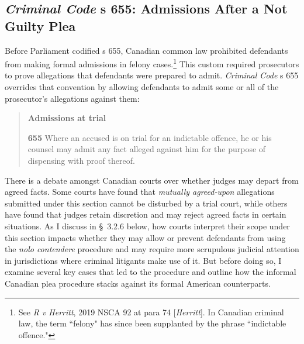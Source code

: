 \subsection{\textit{Criminal Code} s 655: Admissions After a Not Guilty Plea}

Before Parliament codified s 655, Canadian common law prohibited defendants from making formal admissions in felony cases.\footnote{See \textit{R v Herritt}, 2019 NSCA 92 at para 74 [\textit{Herritt}]. In Canadian criminal law, the term ``felony" has since been supplanted by the phrase ``indictable offence."} This custom required prosecutors to prove allegations that defendants were prepared to admit. \textit{Criminal Code} s 655 overrides that convention by allowing defendants to admit some or all of the prosecutor's allegations against them:

\begin{quote}
    \singlespacing
    \textbf{Admissions at trial}
    
    \textbf{655} Where an accused is on trial for an indictable offence, he or his counsel may admit any fact alleged against him for the purpose of dispensing with proof thereof.
\end{quote}
There is a debate amongst Canadian courts over whether judges may depart from agreed facts. Some courts have found that \textit{mutually agreed-upon} allegations submitted under this section cannot be disturbed by a trial court, while others have found that judges retain discretion and may reject agreed facts in certain situations. As I discuss in § 3.2.6 below, how courts interpret their scope under this section impacts whether they may allow or prevent defendants from using the \textit{nolo contendere} procedure and may require more scrupulous judicial attention in jurisdictions where criminal litigants make use of it. But before doing so, I examine several key cases that led to the procedure and outline how the informal Canadian plea procedure stacks against its formal American counterparts.